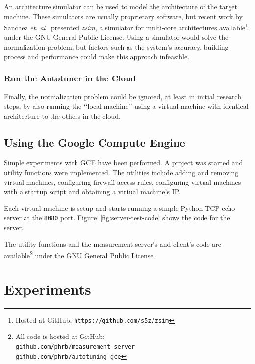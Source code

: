 \documentclass[a4paper, 12pt]{article}
\begin{document}
An architecture simulator can be used to model the architecture
of the target machine. These simulators are usually proprietary
software, but recent work by Sanchez \emph{et. al}~\cite{sanchez2013zsim}
presented \emph{zsim}, a simulator for multi-core architectures 
available\footnote{Hosted at GitHub: \texttt{\scriptsize https://github.com/s5z/zsim}}
under the GNU General Public License.
Using a simulator would solve the normalization problem, but factors
such as the system's accuracy, building process and performance
could make this approach infeasible.

\subsubsection{Run the Autotuner in the Cloud}

Finally, the normalization problem could be ignored, at least
in initial research steps, by also running the \lq{}\lq{}local
machine\rq{}\rq{} using a virtual machine with identical architecture 
to the others in the cloud.

\subsection{Using the Google Compute Engine} \label{sec:pwork}

Simple experiments with GCE have been performed. A project
was started and utility functions were implemented.
The utilities include adding and removing virtual machines,
configuring firewall access rules, configuring virtual machines
with a startup script and obtaining a virtual machine's IP.

Each virtual machine is setup and starts running a simple
Python TCP echo server at the \texttt{\footnotesize 8080}
port. Figure~\ref{fig:server-test-code} shows the code for the
server.

The utility functions and the measurement server's and client's code
are available\footnote{All code is hosted at GitHub: \\
\texttt{\scriptsize github.com/phrb/measurement-server} \\
\texttt{\scriptsize github.com/phrb/autotuning-gce}}
under the GNU General Public License.



\section{Experiments} \label{sec:exp}
\end{document}
